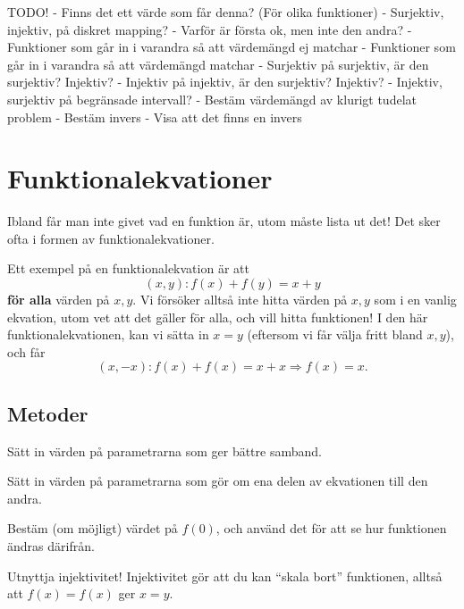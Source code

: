 TODO!
        - Finns det ett värde som får denna? (För olika funktioner)
        - Surjektiv, injektiv, på diskret mapping?
        - Varför är första ok, men inte den andra?
            - Funktioner som går in i varandra så att värdemängd ej matchar 
            - Funktioner som går in i varandra så att värdemängd matchar 
        - Surjektiv på surjektiv, är den surjektiv? Injektiv?
        - Injektiv på injektiv, är den surjektiv? Injektiv?
        - Injektiv, surjektiv på begränsade intervall?
        - Bestäm värdemängd av klurigt tudelat problem
        - Bestäm invers
        - Visa att det finns en invers






\section{Funktionalekvationer}
Ibland får man inte givet vad en funktion är, utom måste lista ut det! Det sker ofta i formen av funktionalekvationer.

\begin{exempel}
	Ett exempel på en funktionalekvation är att
	\[
		(x,y): f(x) + f(y) = x + y
	\]
	\textbf{för alla} värden på \(x, y\). Vi försöker alltså inte hitta värden på \(x, y\) som i en vanlig ekvation, utom vet att det gäller för alla, och vill hitta funktionen! 
	I den här funktionalekvationen, kan vi sätta in \(x=y\) (eftersom vi får välja fritt bland \(x, y\)), och får
	\[
		(x, -x) : f(x) + f(x) = x + x \Rightarrow f(x) = x.
	\]
\end{exempel}

\subsection{Metoder}
\begin{metod}[Substitution]
	Sätt in värden på parametrarna som ger bättre samband.
\end{metod}

\begin{metod}[Symmetri]
	Sätt in värden på parametrarna som gör om ena delen av ekvationen till den andra.
\end{metod}

\begin{metod}[Bestäm \(f(0)\)]
	Bestäm (om möjligt) värdet på \(f(0)\), och använd det för att se hur funktionen ändras därifrån.
\end{metod}

\begin{metod}
	Utnyttja injektivitet! Injektivitet gör att du kan ``skala bort'' funktionen, alltså att \(f(x) = f(x)\) ger \(x = y\).
\end{metod}


